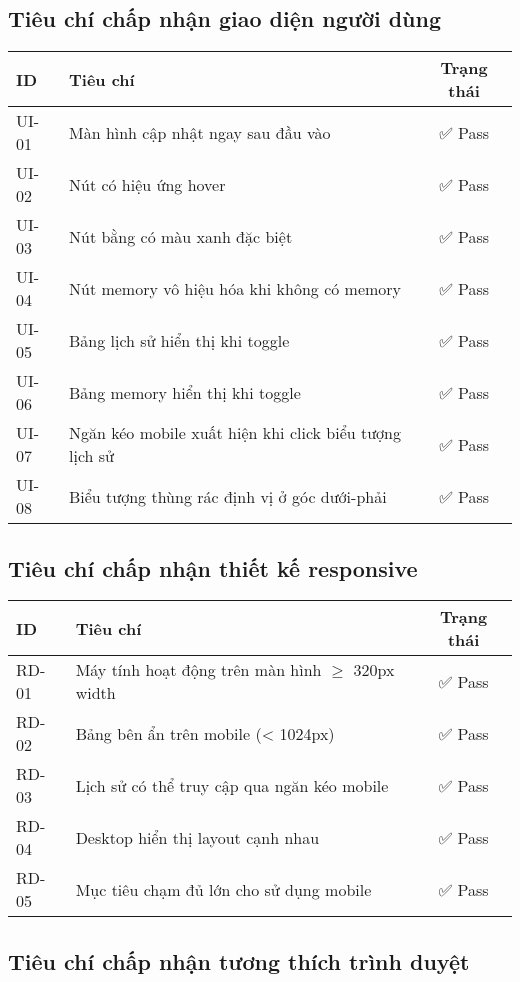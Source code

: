 \subsection{Tiêu chí chấp nhận giao diện người dùng}

\begin{longtable}{|l|p{8cm}|c|}
\hline
\textbf{ID} & \textbf{Tiêu chí} & \textbf{Trạng thái} \\
\hline
\endhead
UI-01 & Màn hình cập nhật ngay sau đầu vào & ✅ Pass \\
UI-02 & Nút có hiệu ứng hover & ✅ Pass \\
UI-03 & Nút bằng có màu xanh đặc biệt & ✅ Pass \\
UI-04 & Nút memory vô hiệu hóa khi không có memory & ✅ Pass \\
UI-05 & Bảng lịch sử hiển thị khi toggle & ✅ Pass \\
UI-06 & Bảng memory hiển thị khi toggle & ✅ Pass \\
UI-07 & Ngăn kéo mobile xuất hiện khi click biểu tượng lịch sử & ✅ Pass \\
UI-08 & Biểu tượng thùng rác định vị ở góc dưới-phải & ✅ Pass \\
\hline
\end{longtable}

\subsection{Tiêu chí chấp nhận thiết kế responsive}

\begin{longtable}{|l|p{8cm}|c|}
\hline
\textbf{ID} & \textbf{Tiêu chí} & \textbf{Trạng thái} \\
\hline
\endhead
RD-01 & Máy tính hoạt động trên màn hình $\geq$ 320px width & ✅ Pass \\
RD-02 & Bảng bên ẩn trên mobile (< 1024px) & ✅ Pass \\
RD-03 & Lịch sử có thể truy cập qua ngăn kéo mobile & ✅ Pass \\
RD-04 & Desktop hiển thị layout cạnh nhau & ✅ Pass \\
RD-05 & Mục tiêu chạm đủ lớn cho sử dụng mobile & ✅ Pass \\
\hline
\end{longtable}

\subsection{Tiêu chí chấp nhận tương thích trình duyệt}

